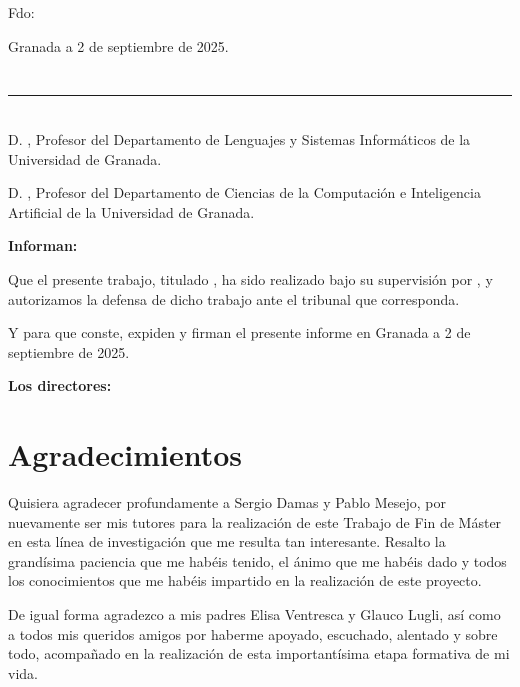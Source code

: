 \vspace{6cm}

\noindent Fdo: \myName

\vspace{2cm}

\begin{flushright}
Granada a 2 de septiembre de 2025.
\end{flushright}


\chapter*{}
\thispagestyle{empty}

\noindent\rule[-1ex]{\textwidth}{2pt}\\[4.5ex]

D. \textbf{\myProf}, Profesor del Departamento de Lenguajes y Sistemas Informáticos de la Universidad de Granada.

\vspace{0.25cm}

D. \textbf{\myOtherProf}, Profesor del Departamento de Ciencias de la Computación e Inteligencia Artificial de la Universidad de Granada.


\vspace{0.25cm}

\textbf{Informan:}

\vspace{0.25cm}

Que el presente trabajo, titulado \textit{\textbf{\myTitle}},
ha sido realizado bajo su supervisión por \textbf{\myName}, y autorizamos la defensa de dicho trabajo ante el tribunal
que corresponda.

\vspace{0.5cm}

Y para que conste, expiden y firman el presente informe en Granada a 2 de septiembre de 2025.

\vspace{0.5cm}

\textbf{Los directores:}

\vspace{5cm}

\noindent \textbf{\myProf \hfill
\myOtherProf}

\chapter*{Agradecimientos}
\thispagestyle{empty}

\vspace{1cm}

Quisiera agradecer profundamente a Sergio Damas y Pablo Mesejo, por nuevamente ser mis tutores para la realización de este Trabajo de Fin de Máster en esta línea de investigación que me resulta tan interesante. Resalto la grandísima paciencia que me habéis tenido, el ánimo que me habéis dado y todos los conocimientos que me habéis impartido en la realización de este proyecto.

De igual forma agradezco a mis padres Elisa Ventresca y Glauco Lugli, así como a todos mis queridos amigos por haberme apoyado, escuchado, alentado y sobre todo, acompañado en la realización de esta importantísima etapa formativa de mi vida.